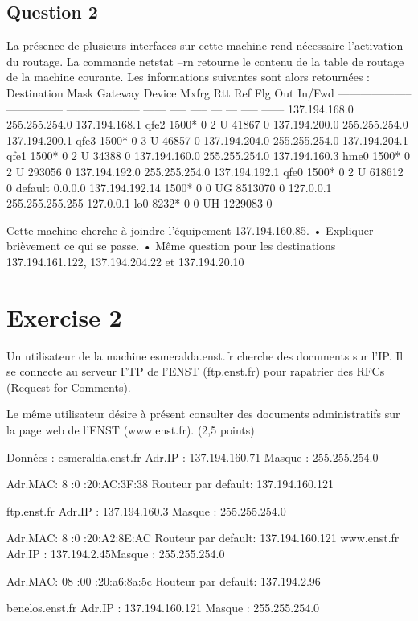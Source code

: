\documentclass{article}
\begin{document}
\subsection*{Question 2}
La présence de plusieurs interfaces sur cette machine rend nécessaire l’activation du routage.
La commande netstat –rn retourne le contenu de la table de routage de la machine courante.
Les informations suivantes sont alors retournées :
Destination Mask Gateway Device Mxfrg Rtt Ref Flg Out In/Fwd
-------------------- --------------- -------------------- ------ ----- ----- --- --- ----- ------
137.194.168.0 255.255.254.0 137.194.168.1 qfe2 1500* 0 2 U 41867 0
137.194.200.0 255.255.254.0 137.194.200.1 qfe3 1500* 0 3 U 46857 0
137.194.204.0 255.255.254.0 137.194.204.1 qfe1 1500* 0 2 U 34388 0
137.194.160.0 255.255.254.0 137.194.160.3 hme0 1500* 0 2 U 293056 0
137.194.192.0 255.255.254.0 137.194.192.1 qfe0 1500* 0 2 U 618612 0
default 0.0.0.0 137.194.192.14 1500* 0 0 UG 8513070 0
127.0.0.1 255.255.255.255 127.0.0.1 lo0 8232* 0 0 UH 1229083 0
\begin{exercise}
    Cette machine cherche à joindre l'équipement 137.194.160.85.
    • Expliquer brièvement ce qui se passe.
    • Même question pour les destinations 137.194.161.122, 137.194.204.22 et
    137.194.20.10
\end{exercise}


\section*{Exercise 2}
Un utilisateur de la machine esmeralda.enst.fr cherche des documents sur l’IP. Il se connecte
au serveur FTP de l’ENST (ftp.enst.fr) pour rapatrier des RFCs (Request for Comments).


Le même utilisateur désire à présent consulter des documents administratifs sur la page web
de l’ENST (www.enst.fr). (2,5 points)

Données :
esmeralda.enst.fr Adr.IP : 137.194.160.71 Masque : 255.255.254.0

Adr.MAC: 8 :0 :20:AC:3F:38
Routeur par default: 137.194.160.121

ftp.enst.fr Adr.IP : 137.194.160.3 Masque : 255.255.254.0

Adr.MAC: 8 :0 :20:A2:8E:AC
Routeur par default: 137.194.160.121
www.enst.fr Adr.IP : 137.194.2.45Masque : 255.255.254.0

Adr.MAC: 08 :00 :20:a6:8a:5c
Routeur par default: 137.194.2.96

benelos.enst.fr Adr.IP : 137.194.160.121 Masque : 255.255.254.0
\end{document}
